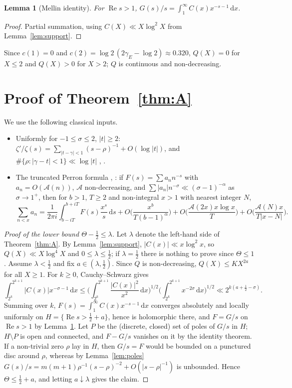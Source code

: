 \documentclass[11pt]{amsart}
\newtheorem{lemma}{Lemma}[section]
\theoremstyle{remark}
\theoremstyle{definition}
\newcommand{\gE}{\gamma_E}
\newcommand{\dd}{\,\mathrm{d}}
\renewcommand{\Re}{\operatorname{Re}}
\begin{document}
\begin{lemma}[Mellin identity]\label{lem:mellin}
For $\Re s>1$, $G(s)/s=\int_1^\infty C(x)x^{-s-1}\dd x$.
\end{lemma}
\begin{proof}
Partial summation, using $C(X)\ll X\log^2X$ from Lemma~\ref{lem:support}.
\end{proof}

Since $c(1)=0$ and $c(2)=\log2\,(2\gE-\log2)\approx0.320$, $Q(X)=0$ for $X\le2$ and $Q(X)>0$ for $X>2$; $Q$ is continuous and non-decreasing.

\section{Proof of Theorem~\ref{thm:A}}\label{sec:A}

We use the following classical inputs.
\begin{itemize}
\item[(F1)] Uniformly for $-1\le\sigma\le2$, $|t|\ge2$: $\zeta'/\zeta(s)=\sum_{|t-\gamma|<1}(s-\rho)^{-1}+O(\log|t|)$, and $\#\{\rho:|\gamma-t|<1\}\ll\log|t|$ \cite[Thms.~9.2, 9.6(A)]{Tit86}, \cite[Ch.~15]{Dav00}.
\item[(F2)] The truncated Perron formula \cite[Lemma~3.12]{Tit86}, \cite[Cor.~5.3]{MV07}: if $F(s)=\sum a_nn^{-s}$ with $a_n=O(\mathcal A(n))$, $\mathcal A$ non-decreasing, and $\sum|a_n|n^{-\sigma}\ll(\sigma-1)^{-\alpha}$ as $\sigma\to1^+$, then for $b>1$, $T\ge2$ and non-integral $x>1$ with nearest integer $N$,
\[
\sum_{n<x}a_n=\frac1{2\pi i}\int_{b-iT}^{b+iT}F(s)\frac{x^s}{s}\dd s+O\Big(\frac{x^b}{T(b-1)^\alpha}\Big)+O\Big(\frac{\mathcal A(2x)x\log x}{T}\Big)+O\Big(\frac{\mathcal A(N)x}{T|x-N|}\Big).
\]
\end{itemize}

\begin{proof}[Proof of the lower bound $\Theta-\frac12\le\lambda$]
Let $\lambda$ denote the left-hand side of Theorem~\ref{thm:A}. By Lemma~\ref{lem:support}, $|C(x)|\ll x\log^2x$, so $Q(X)\ll X\log^4X$ and $0\le\lambda\le\frac12$; if $\lambda=\frac12$ there is nothing to prove since $\Theta\le1$. Assume $\lambda<\frac12$ and fix $a\in(\lambda,\frac12)$. Since $Q$ is non-decreasing, $Q(X)\le KX^{2a}$ for all $X\ge1$. For $k\ge0$, Cauchy--Schwarz gives
\[
\int_{2^k}^{2^{k+1}}|C(x)|x^{-\sigma-1}\dd x\le\Big(\int_{2^k}^{2^{k+1}}\frac{|C(x)|^2}{x^2}\dd x\Big)^{1/2}\Big(\int_{2^k}^{2^{k+1}}x^{-2\sigma}\dd x\Big)^{1/2}\ll2^{k(a+\frac12-\sigma)} .
\]
Summing over $k$, $F(s)=\int_1^\infty C(x)x^{-s-1}\dd x$ converges absolutely and locally uniformly on $H=\{\Re s>\frac12+a\}$, hence is holomorphic there, and $F=G/s$ on $\Re s>1$ by Lemma~\ref{lem:mellin}. Let $P$ be the (discrete, closed) set of poles of $G/s$ in $H$; $H\setminus P$ is open and connected, and $F-G/s$ vanishes on it by the identity theorem. If a non-trivial zero $\rho$ lay in $H$, then $G/s=F$ would be bounded on a punctured disc around $\rho$, whereas by Lemma~\ref{lem:poles} $G(s)/s=m(m+1)\rho^{-1}(s-\rho)^{-2}+O(|s-\rho|^{-1})$ is unbounded. Hence $\Theta\le\frac12+a$, and letting $a\downarrow\lambda$ gives the claim.
\end{proof}
\end{document}
